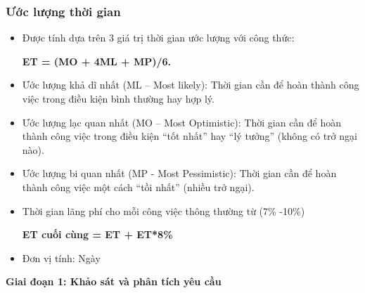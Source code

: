 \documentclass[12pt]{article}
\begin{document}
\subsubsection{Ước lượng thời gian}
\begin{itemize}[label=-, leftmargin=1cm]
    \item Được tính dựa trên 3 giá trị thời gian ước lượng với công thức:
        \begin{center}
            \textbf{ET = (MO + 4ML + MP)/6.}
        \end{center}
    \item Ước lượng khả dĩ nhất (ML – Most likely): Thời gian cần để hoàn thành công việc trong điều kiện bình thường hay hợp lý.
    \item Ước lượng lạc quan nhất (MO – Most Optimistic): Thời gian cần để hoàn thành công việc trong điều kiện “tốt nhất” hay “lý tưởng” (không có trở ngại nào).
    \item Ước lượng bi quan nhất (MP - Most Pessimistic): Thời gian cần để hoàn thành công việc một cách “tồi nhất” (nhiều trở ngại).
    \item Thời gian lãng phí cho mỗi công việc thông thường từ (7\% -10\%)
        \begin{center}
            \textbf{ET cuối cùng = ET + ET*8\%}
        \end{center}
    \item Đơn vị tính: Ngày
\end{itemize}
\begin{center}
    \textbf{Giai đoạn 1: Khảo sát và phân tích yêu cầu}
\end{center}
 
\end{document}
